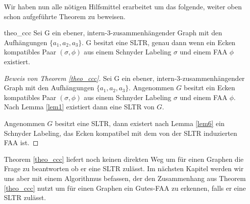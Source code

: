 Wir haben nun alle nötigen Hilfsmittel erarbeitet um das folgende, weiter oben schon aufgeführte Theorem zu beweisen.

\begin{reptheorem}{theo_ccc}
Sei G ein ebener, intern-3-zusammenhängender Graph mit den Aufhängungen $\{a_1,a_2,a_3\}$. G besitzt eine SLTR, genau dann wenn ein Ecken kompatibles Paar $(\sigma,\phi)$ aus einem Schnyder Labeling $\sigma$ und einem FAA $\phi$ existiert.
\end{reptheorem}

\begin{proof}[Beweis von Theorem \ref{theo_ccc}]
Sei G ein ebener, intern-3-zusammenhängender Graph mit den Aufhängungen $\{a_1,a_2,a_3\}$. Angenommen $G$ besitzt ein Ecken kompatibles Paar $(\sigma,\phi)$ aus einem Schnyder Labeling $\sigma$ und einem FAA $\phi$. Nach Lemma \ref{lem1} existiert dann eine SLTR von $G$. 

Angenommen $G$ besitzt eine SLTR, dann existert nach Lemma \ref{lem6} ein Schnyder Labeling, das Ecken kompatibel mit dem von der SLTR induzierten FAA ist.
\end{proof}

Theorem \ref{theo_ccc} liefert noch keinen direkten Weg um für einen Graphen die Frage zu beantworten ob er eine SLTR zulässt. Im nächsten Kapitel werden wir uns aber mit einem Algorithmus befassen, der den Zusammenhang aus Theorem \ref{theo_ccc} nutzt um für einen Graphen ein Gutes-FAA zu erkennen, falls er eine SLTR zulässt.





